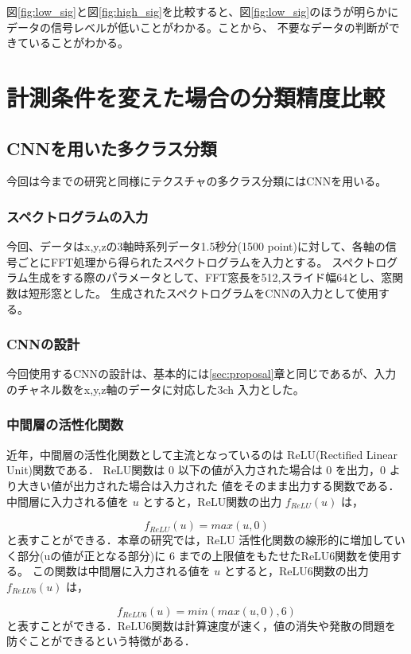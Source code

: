 図\ref{fig:low_sig}と図\ref{fig:high_sig}を比較すると、図\ref{fig:low_sig}のほうが明らかにデータの信号レベルが低いことがわかる。ことから、
不要なデータの判断ができていることがわかる。

\section{計測条件を変えた場合の分類精度比較}
	\subsection{CNNを用いた多クラス分類}
		今回は今までの研究と同様にテクスチャの多クラス分類にはCNNを用いる。

		\subsubsection{スペクトログラムの入力}
			今回、データはx,y,zの3軸時系列データ1.5秒分(1500 point)に対して、各軸の信号ごとにFFT処理から得られたスペクトログラムを入力とする。
			スペクトログラム生成をする際のパラメータとして、FFT窓長を512,スライド幅64とし、窓関数は短形窓とした。
			生成されたスペクトログラムをCNNの入力として使用する。
		\subsubsection{CNNの設計}
			今回使用するCNNの設計は、基本的には\ref{sec:proposal}章と同じであるが、入力のチャネル数をx,y,z軸のデータに対応した3ch
			入力とした。

		\subsubsection{中間層の活性化関数}
			近年，中間層の活性化関数として主流となっているのは ReLU(Rectified Linear Unit)関数である．
			ReLU関数は 0 以下の値が入力された場合は 0 を出力，0 より大きい値が出力された場合は入力された
			値をそのまま出力する関数である．
			中間層に入力される値を $u$ とすると，ReLU関数の出力 $f_{ReLU}(u)$ は，
			
			\begin{equation}
			f_{ReLU}(u) = max(u,0)
			\label{f_relu}
			\end{equation}
			と表すことができる．本章の研究では，ReLU 活性化関数の線形的に増加していく部分(uの値が正となる部分)に
			6 までの上限値をもたせたReLU6関数を使用する。
			この関数は中間層に入力される値を $u$ とすると，ReLU6関数の出力 $f_{ReLU6}(u)$ は，
			
			\begin{equation}
			f_{ReLU6}(u) = min(max(u,0),6)
			\label{f_relu}
			\end{equation}
			と表すことができる．ReLU6関数は計算速度が速く，値の消失や発散の問題を防ぐことができるという特徴がある\cite{tensorflow}．
		

